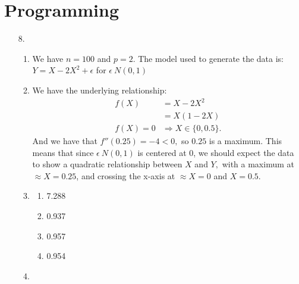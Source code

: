 \documentclass{article}
\begin{document}
\section{Programming}
\begin{enumerate}
    \item [8. ]
    
    \begin{enumerate}
        \item 
        
        We have $n = 100$ and $p = 2.$ The model used to generate the data is: $Y = X - 2X^2 + \epsilon$ for $\epsilon ~ N(0, 1)$
        
        \item
        
        We have the underlying relationship: 
        \begin{align*}
            f(X) &= X-2X^2\\
            &= X(1-2X)\\
            f(X) = 0 &\Rightarrow X\in \{0, 0.5\}.
        \end{align*} And we have that $f''(0.25) = -4 < 0,$ so $0.25$ is a maximum. This means that since $\epsilon ~ N(0, 1)$ is centered at $0$, we should expect the data to show a quadratic relationship between $X$ and $Y,$ with a maximum at $\approx X = 0.25$, and crossing the x-axis at $\approx X = 0$ and $X = 0.5.$
        
        \item
        
        \begin{enumerate}
            \item 
            
            7.288
            
            \item
            
            0.937
            
            \item
            
            0.957
            
            \item
            
            0.954
            
        \end{enumerate}
        
        \item
        

\end{enumerate}
\end{enumerate}
\end{document}
